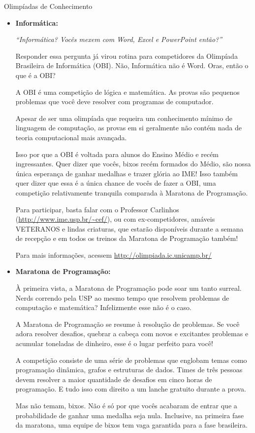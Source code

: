 \begin{subsecao}{Olimpíadas de Conhecimento}
\begin{itemize}
\item{\bf Informática: }

\textit{``Informática? Vocês mexem com Word, Excel e PowerPoint então?''}

Responder essa pergunta já virou rotina para competidores da
Olimpíada Brasileira de Informática (OBI). Não, Informática 
não é Word. Oras, então o que é a OBI?

A OBI é uma competição de lógica e matemática. As provas são pequenos
problemas que você deve resolver com programas de computador.

Apesar de ser uma olimpíada que requeira um conhecimento mínimo de 
linguagem de computação, as provas em si geralmente não contém nada 
de teoria computacional mais avançada. 

Isso por que a OBI é voltada para alunos do Ensino Médio e recém
ingressantes. Quer dizer que vocês, bixos recém formados do Médio,
são nossa única esperança de ganhar medalhas e trazer glória ao IME!
Isso também quer dizer que essa é a única chance de vocês de fazer a OBI,
uma competição relativamente tranquila comparada à Maratona de 
Programação.

Para participar, basta falar com o Professor Carlinhos (\url{http://www.ime.usp.br/~cef/}), 
ou com ex-competidores, amáveis VETERANOS e lindas criaturas, que estarão disponíveis
durante a semana de recepção e em todos os treinos da Maratona de Programação também!

Para mais informações, acessem \url{http://olimpiada.ic.unicamp.br/}


\item{\bf Maratona de Programação: }

À primeira vista, a Maratona de Programação pode soar um tanto
surreal. Nerds correndo pela USP ao mesmo tempo que resolvem
problemas de computação e matemática? Infelizmente esse não
é o caso.

A Maratona de Programação se resume à resolução de problemas.
Se você adora resolver desafios, quebrar a cabeça com novos
e excitantes problemas e acumular toneladas de dinheiro, esse
é o lugar perfeito para você!

A competição consiste de uma série de problemas que englobam
temas como programação dinâmica, grafos e estruturas de dados.
Times de três pessoas devem resolver a maior quantidade de
desafios em cinco horas de programação. E tudo isso com direito
a um lanche gratuito durante a prova.

Mas não temam, bixos. Não é só por que vocês acabaram de entrar que
a probabilidade de ganhar uma medalha seja nula. Inclusive, na primeira
fase da maratona, uma equipe de bixos tem vaga garantida para a
fase brasileira.


\end{itemize}
\end{subsecao}
